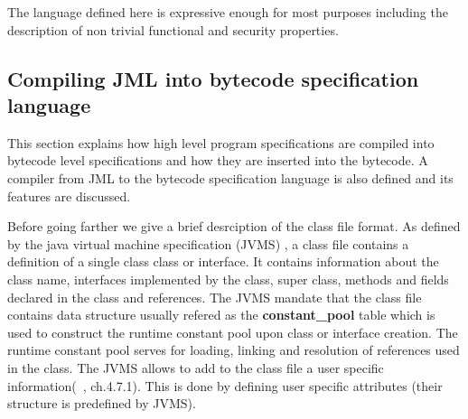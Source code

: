  The language defined here is expressive enough for most purposes including the description of non trivial functional and security properties.


\subsection{Compiling JML into bytecode specification language}


This section explains how high level program specifications are compiled into bytecode level specifications and how they are inserted into the bytecode. 
 A compiler from JML to the bytecode specification language is also defined and its features are discussed.


Before going farther we give a brief desrciption of the class file format. As defined by the java virtual machine  specification (JVMS) \cite{VMSpec}, a class file contains a definition of a single class class or interface. It contains information about the class name, interfaces implemented by the class, super class, methods and fields declared in the class and references. The JVMS mandate that the class file contains data structure usually refered as the \textbf{constant\_pool} table which is used to construct the runtime constant pool upon class or interface creation. The runtime constant pool serves for loading, linking and resolution of references used in the class. The JVMS allows to add to the class file a user specific information(~\cite{VMSpec}, ch.4.7.1). This is done by defining user specific attributes  (their structure is predefined by JVMS).

